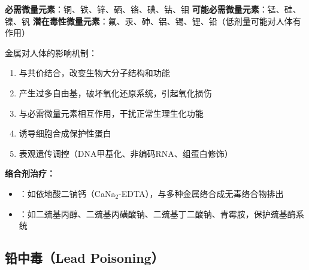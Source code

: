 \begin{defbox}
\textbf{必需微量元素}：铜、铁、锌、硒、铬、碘、钴、钼
\textbf{可能必需微量元素}：锰、硅、镍、钒
\textbf{潜在毒性微量元素}：氟、汞、砷、铝、锡、锂、铅（低剂量可能对人体有作用）

金属对人体的影响机制：
\begin{enumerate}[leftmargin=*]
    \item 与共价结合，改变生物大分子结构和功能
    \item 产生过多自由基，破坏氧化还原系统，引起氧化损伤
    \item 与必需微量元素相互作用，干扰正常生理生化功能
    \item 诱导细胞合成保护性蛋白
    \item 表观遗传调控（DNA甲基化、非编码RNA、组蛋白修饰）
\end{enumerate}

\textbf{络合剂治疗：}
\begin{itemize}[leftmargin=*]
    \item {}：如依地酸二钠钙（CaNa$_2$-EDTA），与多种金属络合成无毒络合物排出
    \item {}：如二巯基丙醇、二巯基丙磺酸钠、二巯基丁二酸钠、青霉胺，保护巯基酶系统
\end{itemize}
\end{defbox}

\subsection{铅中毒（Lead Poisoning）}

